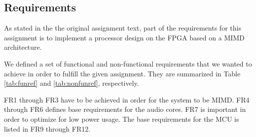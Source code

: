 \subsection{Requirements}\label{intro:requirements}

As stated in the the original assignment text, part of the requirements for this
assignment is to implement a processor design on the FPGA based on a MIMD
architecture.

We defined a set of functional and non-functional requirements that we wanted to
achieve in order to fulfill the given assignment. They are summarized in Table
\ref{tab:funref} and \ref{tab:nonfunref}, respectively.




FR1 through FR3 have to be achieved in order for the system to be MIMD.
FR4 through FR6 defines base requirements for the audio cores.
FR7 is important in order to optimize for low power usage. The base
requirements for the MCU is listed in FR9 through FR12.
